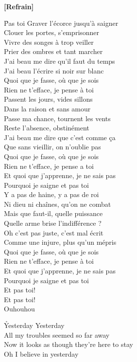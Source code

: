 \documentclass{novel}
\begin{document}
\textbf{[Refrain]}

\newpage
\normalsize
\h*{Pas toi}
Graver l'écorce jusqu'à saigner\\
Clouer les portes, s'emprisonner\\
Vivre des songes à trop veiller\\
Prier des ombres et tant marcher\\
J'ai beau me dire qu'il faut du temps\\
J'ai beau l'écrire si noir sur blanc\\

Quoi que je fasse, où que je sois\\
Rien ne t'efface, je pense à toi\\

Passent les jours, vides sillons\\
Dans la raison et sans amour\\
Passe ma chance, tournent les vents\\
Reste l'absence, obstinément\\
J'ai beau me dire que c'est comme ça\\
Que sans vieillir, on n'oublie pas\\

Quoi que je fasse, où que je sois\\
Rien ne t'efface, je pense a toi\\
Et quoi que j'apprenne, je ne sais pas\\
Pourquoi je saigne et pas toi\\

Y a pas de haine, y a pas de roi\\
Ni dieu ni chaînes, qu'on ne combat\\
Mais que faut-il, quelle puissance\\
Quelle arme brise l'indifférence ?\\
Oh c'est pas juste, c'est mal écrit\\
Comme une injure, plus qu'un mépris\\

Quoi que je fasse, où que je sois\\
Rien ne t'efface, je pense à toi\\
Et quoi que j'apprenne, je ne sais pas\\
Pourquoi je saigne et pas toi\\
Et pas toi!\\
Et pas toi!\\
Ouhouhou

\newpage
\normalsize
\h*{Yesterday}
Yesterday\\
All my troubles seemed so far away\\
Now it looks as though they're here to stay\\
Oh I believe in yesterday\\
\end{document}
